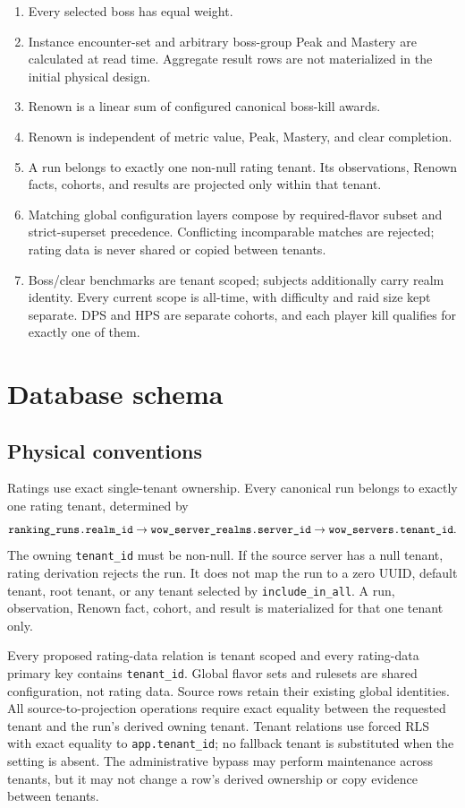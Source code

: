 \documentclass[11pt]{article}
\newcommand{\field}[1]{\texttt{#1}}
\begin{document}
\begin{enumerate}
  \item Every selected boss has equal weight.
  \item Instance encounter-set and arbitrary boss-group Peak and Mastery are calculated at read time. Aggregate result rows are not materialized in the initial physical design.
  \item Renown is a linear sum of configured canonical boss-kill awards.
  \item Renown is independent of metric value, Peak, Mastery, and clear completion.
  \item A run belongs to exactly one non-null rating tenant. Its observations, Renown facts, cohorts, and results are projected only within that tenant.
  \item Matching global configuration layers compose by required-flavor subset and strict-superset precedence. Conflicting incomparable matches are rejected; rating data is never shared or copied between tenants.
  \item Boss/clear benchmarks are tenant scoped; subjects additionally carry realm identity. Every current scope is all-time, with difficulty and raid size kept separate. DPS and HPS are separate cohorts, and each player kill qualifies for exactly one of them.
\end{enumerate}

\section{Database schema}

\subsection{Physical conventions}
Ratings use exact single-tenant ownership. Every canonical run belongs to exactly one rating tenant, determined by
\[
\field{ranking\_\allowbreak runs.\allowbreak realm\_\allowbreak id}
\rightarrow\field{wow\_\allowbreak server\_\allowbreak realms.\allowbreak server\_\allowbreak id}
\rightarrow\field{wow\_\allowbreak servers.\allowbreak tenant\_\allowbreak id}.
\]
The owning \field{tenant\_\allowbreak id} must be non-null. If the source server has a null tenant, rating derivation rejects the run. It does not map the run to a zero UUID, default tenant, root tenant, or any tenant selected by \field{include\_\allowbreak in\_\allowbreak all}. A run, observation, Renown fact, cohort, and result is materialized for that one tenant only.

Every proposed rating-data relation is tenant scoped and every rating-data primary key contains \field{tenant\_\allowbreak id}. Global flavor sets and rulesets are shared configuration, not rating data. Source rows retain their existing global identities. All source-to-projection operations require exact equality between the requested tenant and the run's derived owning tenant. Tenant relations use forced RLS with exact equality to \field{app.\allowbreak tenant\_\allowbreak id}; no fallback tenant is substituted when the setting is absent. The administrative bypass may perform maintenance across tenants, but it may not change a row's derived ownership or copy evidence between tenants.
\end{document}
